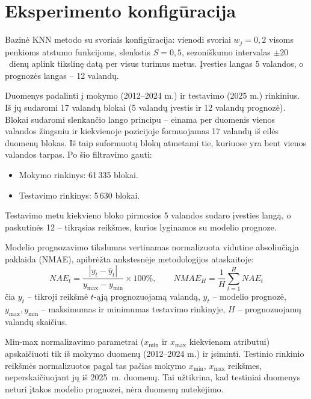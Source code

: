 \documentclass[]{VUMIFTemplateClass}
\begin{document}

    \onehalfspacing
    

    \singlespacing

    \tableofcontents
    \onehalfspacing


    \section{Eksperimento konfigūracija}

    Bazinė KNN metodo su svoriais konfigūracija: vienodi svoriai $w_j = 0{,}2$ visoms penkioms atstumo funkcijoms, slenkstis $S = 0{,}5$, sezoniškumo intervalas $\pm 20$~dienų aplink tikslinę datą per visus turimus metus.
    Įvesties langas 5 valandos, o prognozės langas -- 12 valandų.

    Duomenys padalinti į mokymo (2012--2024 m.) ir testavimo (2025 m.) rinkinius.
    Iš jų sudaromi 17 valandų blokai (5 valandų įvestis ir 12 valandų  prognozė).
    Blokai sudaromi slenkančio lango principu -- einama per duomenis vienos valandos žingsniu ir kiekvienoje pozicijoje formuojamas 17 valandų iš eilės duomenų blokas.
    Iš taip suformuotų blokų atmetami tie, kuriuose yra bent vienos valandos tarpas.
    Po šio filtravimo gauti:
    \begin{itemize}
        \item Mokymo rinkinys: 61\,335 blokai.
        \item Testavimo rinkinys: 5\,630 blokai.
    \end{itemize}

    Testavimo metu kiekvieno bloko pirmosios 5 valandos sudaro įvesties langą, o paskutinės 12 -- tikrąsias reikšmes, kurios lyginamos su modelio prognoze.

    Modelio prognozavimo tikslumas vertinamas normalizuota vidutine absoliučiąja paklaida (NMAE), apibrėžta ankstesnėje metodologijos ataskaitoje:
    \begin{equation}
        NAE_t = \frac{|y_t - \hat{y}_t|}{y_{\max} - y_{\min}} \times 100\%, \qquad
        NMAE_H = \frac{1}{H} \sum_{t=1}^{H} NAE_t
    \end{equation}
    čia $y_t$ -- tikroji  reikšmė $t$-ąją prognozuojamą valandą, $\hat{y}_t$ -- modelio prognozė, $y_{\max}, y_{\min}$ --  maksimumas ir minimumas testavimo rinkinyje, $H$ -- prognozuojamų valandų skaičius.

    Min-max normalizavimo parametrai ($x_{\min}$ ir $x_{\max}$ kiekvienam atributui) apskaičiuoti tik iš mokymo duomenų (2012--2024 m.) ir įsiminti.
    Testinio rinkinio reikšmės normalizuotos pagal tas pačias mokymo $x_{\min}$, $x_{\max}$ reikšmes, neperskaičiuojant jų iš 2025~m. duomenų.
    Tai užtikrina, kad testiniai duomenys neturi įtakos modelio prognozei, nėra duomenų nutekėjimo.
\end{document}
